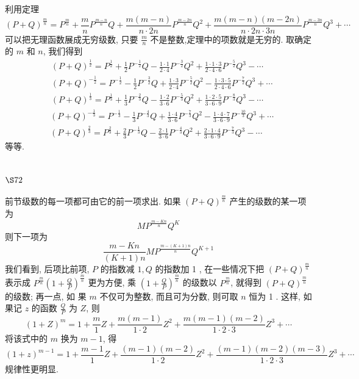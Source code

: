 利用定理
\[
(P+Q)^{\frac{m}{n}}=P^{\frac{m}{n}}+\frac{m}{n} P^{\frac{m-n}{n}} Q+\frac{m(m-n)}{n \cdot 2 n} P^{\frac{m-2 n}{n}} Q^{2}+\frac{m(m-n)(m-2 n)}{n \cdot 2 n \cdot 3 n} P^{\frac{m-3 n}{n}} Q^{3}+\cdots
\]
可以把无理函数展成无穷级数, 只要 $\frac{m}{n}$ 不是整数,定理中的项数就是无穷的. 取确定的 $m$ 和 $n$, 我们得到
\[
\begin{aligned}
& (P+Q)^{\frac{1}{2}}=P^{\frac{1}{2}}+\frac{1}{2} P^{-\frac{1}{2}} Q-\frac{1 \cdot 1}{2 \cdot 4} P^{-\frac{3}{2}} Q^{2}+\frac{1 \cdot 1 \cdot 3}{2 \cdot 4 \cdot 6} P^{-\frac{5}{2}} Q^{3}-\cdots \\
& (P+Q)^{-\frac{1}{2}}=P^{-\frac{1}{2}}-\frac{1}{2} P^{-\frac{3}{2}} Q+\frac{1 \cdot 3}{2 \cdot 4} P^{-\frac{5}{2}} Q^{2}-\frac{1 \cdot 3 \cdot 5}{2 \cdot 4 \cdot 6} P^{-\frac{7}{2}} Q^{3}+\cdots \\
& (P+Q)^{\frac{1}{3}}=P^{\frac{1}{3}}+\frac{1}{3} P^{-\frac{2}{3}} Q-\frac{1 \cdot 2}{3 \cdot 6} P^{-\frac{5}{3}} Q^{2}+\frac{1 \cdot 2 \cdot 5}{3 \cdot 6 \cdot 9} P^{-\frac{8}{3}} Q^{3}-\cdots
\end{aligned}
\]
\[
\begin{aligned}
& (P+Q)^{-\frac{1}{3}}=P^{-\frac{1}{3}}-\frac{1}{3} P^{-\frac{4}{3}} Q+\frac{1 \cdot 4}{3 \cdot 6} P^{-\frac{7}{3}} Q^{2}-\frac{1 \cdot 4 \cdot 7}{3 \cdot 6 \cdot 9} P^{-\frac{10}{3}} Q^{3}+\cdots \\
& (P+Q)^{\frac{2}{3}}=P^{\frac{2}{3}}+\frac{2}{3} P^{-\frac{1}{3}} Q-\frac{2 \cdot 1}{3 \cdot 6} P^{-\frac{4}{3}} Q^{2}+\frac{2 \cdot 1 \cdot 4}{3 \cdot 6 \cdot 9} P^{-\frac{7}{3}} Q^{3}-\cdots
\end{aligned}
\]
等等.

\section{$\S 72$}

前节级数的每一项都可由它的前一项求出. 如果 $(P+Q)^{\frac{m}{n}}$ 产生的级数的某一项为
\[
M P^{\frac{m-K n}{n}} Q^{K}
\]
则下一项为
\[
\frac{m-K n}{(K+1) n} M P^{\frac{m-(K+1) n}{n}} Q^{K+1}
\]
我们看到, 后项比前项, $P$ 的指数减 $1, Q$ 的指数加 1 , 在一些情况下把 $(P+Q)^{\frac{m}{n}}$ 表示成 $P^{\frac{m}{n}}\left(1+\frac{Q}{P}\right)^{\frac{m}{n}}$ 更为方便, 乘 $\left(1+\frac{Q}{P}\right)^{\frac{m}{n}}$ 的级数以 $P^{\frac{m}{n}}$, 就得到 $(P+Q)^{\frac{m}{n}}$ 的级数; 再一点, 如 果 $m$ 不仅可为整数, 而且可为分数, 则可取 $n$ 恒为 1 . 这样, 如果记 $z$ 的函数 $\frac{Q}{P}$ 为 $Z$, 则
\[
(1+Z)^{m}=1+\frac{m}{1} Z+\frac{m(m-1)}{1 \cdot 2} Z^{2}+\frac{m(m-1)(m-2)}{1 \cdot 2 \cdot 3} Z^{3}+\cdots
\]
将该式中的 $m$ 换为 $m-1$, 得
\[
(1+z)^{m-1}=1+\frac{m-1}{1} Z+\frac{(m-1)(m-2)}{1 \cdot 2} Z^{2}+\frac{(m-1)(m-2)(m-3)}{1 \cdot 2 \cdot 3} Z^{3}+\cdots
\]
规律性更明显.

